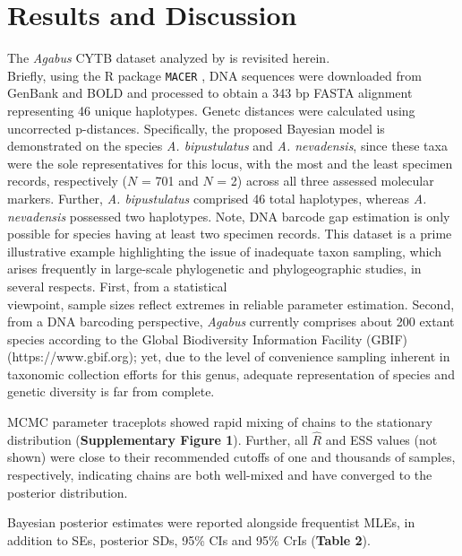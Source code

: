 \documentclass[12pt]{article}
\begin{document}
\section{Results and Discussion}

The \textit{Agabus} CYTB dataset analyzed by \citet{phillips2024measure} is revisited herein. \\ Briefly, using the R package {\tt MACER} \citep{young2021macer}, DNA sequences were downloaded from GenBank and BOLD and processed to obtain a 343 bp FASTA alignment representing 46 unique haplotypes. Genetc distances were calculated using uncorrected p-distances. Specifically, the proposed Bayesian model is demonstrated on the species \textit{A. bipustulatus} and \textit{A. nevadensis}, since these taxa were the sole representatives for this locus, with the most and the least specimen records, respectively ($N$ = 701 and $N$ = 2) across all three assessed molecular markers. Further, \textit{A. bipustulatus} comprised 46 total haplotypes, whereas \textit{A. nevadensis} possessed two haplotypes. Note, DNA barcode gap estimation is only possible for species having at least two specimen records. This dataset is a prime illustrative example highlighting the issue of inadequate taxon sampling, which arises frequently in large-scale phylogenetic and phylogeographic studies, in several respects. First, from a statistical \\ viewpoint, sample sizes reflect extremes in reliable parameter estimation. Second, from a DNA barcoding perspective, \textit{Agabus} currently comprises about 200 extant species according to the Global Biodiversity Information Facility (GBIF) (https://www.gbif.org); yet, due to the level of convenience sampling inherent in taxonomic collection efforts for this genus, adequate representation of species and genetic diversity is far from complete. 

MCMC parameter traceplots showed rapid mixing of chains to the stationary distribution (\textbf{Supplementary Figure 1}). Further, all $\hat{R}$ and ESS values (not shown) were close to their recommended cutoffs of one and thousands of samples, respectively, indicating chains are both well-mixed and have converged to the posterior distribution.  

Bayesian posterior estimates were reported alongside frequentist MLEs, in addition to SEs, posterior SDs, 95\% CIs and 95\% CrIs (\textbf{Table 2}).
\end{document}
